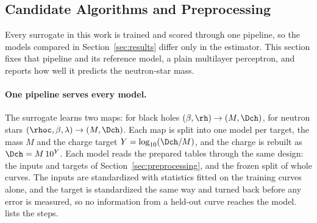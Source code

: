 \subsection{Candidate Algorithms and Preprocessing}
\label{sec:algorithms}

\providecommand{\baseNsMassMare}{\placeholder{run make baseline}}
\providecommand{\baseNsMassRmse}{\placeholder{run make baseline}}
\providecommand{\baseNsMassFitSeconds}{\placeholder{run make baseline}}
\providecommand{\baseNsMassEpochs}{\placeholder{run make baseline}}
\providecommand{\baseNsChargeMareTrueM}{\placeholder{run make baseline}}
\providecommand{\baseNsChargeMarePredM}{\placeholder{run make baseline}}
\providecommand{\baseBhChargeMareTrueM}{\placeholder{run make baseline}}
\providecommand{\baseBhChargeMarePredM}{\placeholder{run make baseline}}

Every surrogate in this work is trained and scored through one pipeline, so the models compared in Section~\ref{sec:results} differ only in the estimator. This section fixes that pipeline and its reference model, a plain multilayer perceptron, and reports how well it predicts the neutron-star mass.

\paragraph{One pipeline serves every model.}
The surrogate learns two maps: for black holes $(\beta, \rh) \to (M, \Dch)$, for neutron stars $(\rhoc, \beta, \lambda) \to (M, \Dch)$. Each map is split into one model per target, the mass $M$ and the charge target $Y = \log_{10}(\Dch/M)$, and the charge is rebuilt as $\Dch = M\,10^{Y}$. Each model reads the prepared tables through the same design: the inputs and targets of Section~\ref{sec:preprocessing}, and the frozen split of whole curves. The inputs are standardized with statistics fitted on the training curves alone, and the target is standardized the same way and turned back before any error is measured, so no information from a held-out curve reaches the model.  lists the steps.

